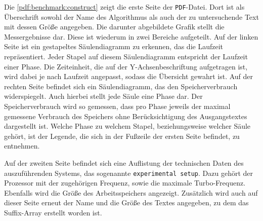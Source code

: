 Die \cref{pdf:benchmark:construct} zeigt die erste Seite der \texttt{PDF}-Datei. Dort ist als Überschrift sowohl der Name des Algorithmus als auch der zu untersuchende Text mit dessen Größe angegeben. Die darunter abgebildete Grafik stellt die Messergebnisse dar. Diese ist wiederum in zwei Bereiche aufgeteilt. Auf der linken Seite ist ein gestapeltes Säulendiagramm zu erkennen, das die Laufzeit repräsentiert. Jeder Stapel auf diesem Säulendiagramm entspricht der Laufzeit einer Phase. Die Zeiteinheit, die auf der Y-Achsenbeschriftung aufgetragen ist, wird dabei je nach Laufzeit angepasst, sodass die Übersicht gewahrt ist. Auf der rechten Seite befindet sich ein Säulendiagramm, das den Speicherverbrauch widerspiegelt. Auch hierbei stellt jede Säule eine Phase dar. Der Speicherverbrauch wird so gemessen, dass pro Phase jeweils der maximal gemessene Verbrauch des Speichers ohne Berücksichtigung des Ausgangstextes dargestellt ist. Welche Phase zu welchem Stapel, beziehungsweise welcher Säule gehört, ist der Le\-gen\-de, die sich in der Fußzeile der ersten Seite befindet, zu entnehmen.

Auf der zweiten Seite befindet sich eine Auflistung der tech\-nisch\-en Daten des auszuführenden Systems, das sogenannte \texttt{experimental setup}. Dazu gehört der Prozessor mit der zugehörigen Frequenz, sowie die maximale Turbo-Frequenz. Ebenfalls wird die Größe des Ar\-beits\-spei\-chers angezeigt. Zusätzlich wird auch auf dieser Seite erneut der Name und die Größe des Textes angegeben, zu dem das Suffix-Array erstellt worden ist.